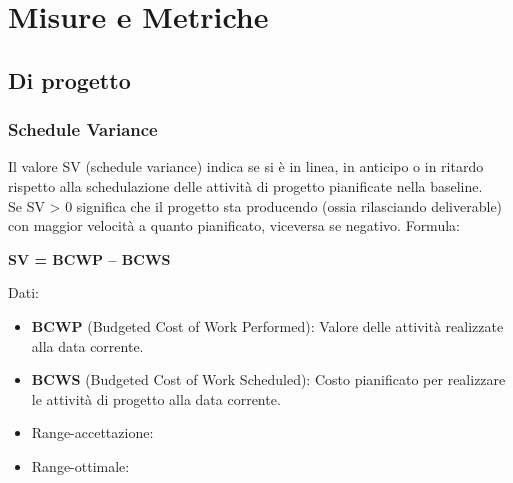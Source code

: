 \documentclass[a4paper,11pt]{article}
\begin{document}
\newpage
\section{Misure e Metriche}
\subsection{Di progetto}
\subsubsection{Schedule Variance}
Il valore SV (schedule variance) indica se si è in linea, in anticipo o in ritardo rispetto alla schedulazione delle attività di progetto pianificate nella baseline.\\
Se SV > 0 significa che il progetto sta producendo (ossia rilasciando deliverable) con maggior velocità a quanto pianificato, viceversa se negativo.
Formula:
\begin{center}
\textbf{SV = BCWP – BCWS\\}
\end{center}
Dati:
\begin{itemize}
\item \textbf{BCWP} (Budgeted Cost of Work Performed): Valore delle attività realizzate alla data corrente.
\item \textbf{BCWS} (Budgeted Cost of Work Scheduled): Costo pianificato per realizzare le attività di progetto alla data corrente.
\end{itemize}
\begin{itemize}
	\item Range-accettazione: \begin{math} [ \ge -(PreventivoFase*5\%)]
	\end{math}
	\item Range-ottimale: \begin{math}[ \ge 0]\end{math}
	\end{itemize}
\end{document}
